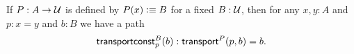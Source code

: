 \documentclass[hott-all.tex]{subfiles}
\begin{document}
\begin{lem}\label{thm:trans-trivial}
  If $P:A\to\mathcal{U}$ is defined by $P(x) \vcentcolon\equiv B$ for a fixed $B:\mathcal{U}$, then for any $x,y:A$ and $p:x=y$ and $b:B$ we have a path
  \[ \mathsf{transportconst}^{B}_{p}(b) : \mathsf{transport}^{P}(p,b) = b. \]
\end{lem}
%
\end{document}
